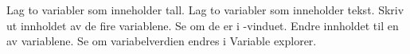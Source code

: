 %
%
Lag to variabler som inneholder tall. Lag to variabler som inneholder tekst. Skriv ut innholdet av de fire variablene. Se om de er i -vinduet. Endre innholdet til en av variablene. Se om variabelverdien endres i Variable explorer.
